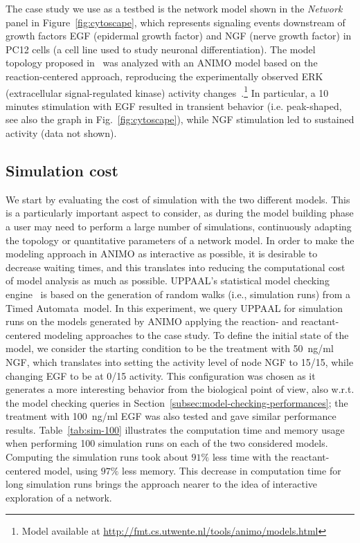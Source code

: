 \documentclass{llncs}
\newcommand{\tas}{Timed Automata}
\begin{document}
The case study we use as a testbed is the network model shown in the \emph{Network} panel in Figure~\ref{fig:cytoscape},
which represents signaling events downstream of growth factors EGF (epidermal growth factor)
and NGF (nerve growth factor) in PC12 cells (a cell line used to study neuronal differentiation).
The model topology proposed in~\cite{egf-ngf} was analyzed
with an ANIMO model based on the reaction-centered approach, reproducing the experimentally 
observed ERK (extracellular signal-regulated kinase) activity changes~\cite{animo-ieee}.\footnote{Model available at \url{http://fmt.cs.utwente.nl/tools/animo/models.html}}
In particular, a 10 minutes stimulation with EGF resulted in transient behavior (i.e. peak-shaped,
see also the graph in Fig.~\ref{fig:cytoscape}), while NGF stimulation led to sustained activity (data not shown).%

\subsection{Simulation cost}
We start by evaluating the cost of simulation with the two different models. This is a particularly
important aspect to consider, as during the model building phase a user may need to perform a large number of simulations,
continuously adapting the topology or quantitative parameters of a network model. In order to make
the modeling approach in ANIMO as interactive as possible, it is desirable to decrease waiting times,
and this translates into reducing the computational cost of model analysis as much as possible.
UPPAAL's statistical model checking engine~\cite{uppaal-smc} is based on the generation of random walks (i.e., simulation runs) from a \tas\ model.
In this experiment, we query UPPAAL for simulation runs on the models
generated by ANIMO applying the reaction- and reactant-centered modeling approaches to the case study.
To define the initial state of the model, we consider the starting condition to be the treatment with 50~ng/ml NGF, which translates into
setting the activity level of node NGF to 15/15, while changing EGF to be at 0/15 activity.
This configuration was chosen as it generates a more interesting behavior from the biological point of view,
also w.r.t. the model checking queries in Section~\ref{subsec:model-checking-performances};
the treatment with 100~ng/ml EGF was also tested and gave similar performance results.
Table~\ref{tab:sim-100} illustrates the computation time and memory usage when performing 100 simulation runs on each of the
two considered models. Computing the simulation runs took about $91 \%$ less time with the reactant-centered model, using $97 \%$
less memory. This decrease in computation time for long simulation runs brings the approach nearer to the idea
of interactive exploration of a network.
\end{document}
